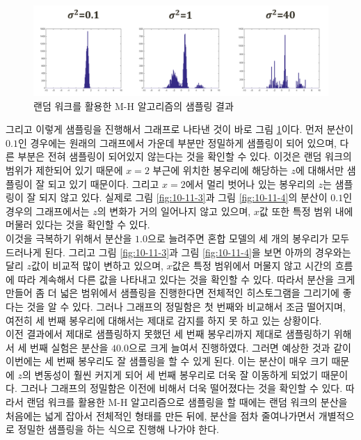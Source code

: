\documentclass[a4paper]{oblivoir}
\begin{document}
\begin{figure}[ht] \centering 
\includegraphics[scale=0.6]{fig10_23.png} 
\caption{랜덤 워크를 활용한 M-H 알고리즘의 샘플링 결과}
\label{fig:10-11-2}
\end{figure}  

그리고 이렇게 샘플링을 진행해서 그래프로 나타낸 것이 바로 그림 \ref{fig:10-11-2}이다. 먼저 분산이 $0.1$인 경우에는 원래의 그래프에서 가운데 부분만 정밀하게 샘플링이 되어 있으며, 다른 부분은 전혀 샘플링이 되어있지 않는다는 것을 확인할 수 있다. 이것은 랜덤 워크의 범위가 제한되어 있기 때문에 $x=2$ 부근에 위치한 봉우리에 해당하는 $z$에 대해서만 샘플링이 잘 되고 있기 때문이다. 그리고 $x=2$에서 멀리 벗어나 있는 봉우리의 $z$는 샘플링이 잘 되지 않고 있다. 실제로 그림 \ref{fig:10-11-3}과 그림 \ref{fig:10-11-4}의 분산이 $0.1$인 경우의 그래프에서는 $z$의 변화가 거의 일어나지 않고 있으며, $x$값 또한 특정 범위 내에 머물러 있다는 것을 확인할 수 있다. \\

이것을 극복하기 위해서 분산을 $1.0$으로 늘려주면 혼합 모델의 세 개의 봉우리가 모두 드러나게 된다. 그리고 그림 \ref{fig:10-11-3}과 그림 \ref{fig:10-11-4}을 보면 아까의 경우와는 달리 $z$값이 비교적 많이 변하고 있으며, $x$값은 특정 범위에서 머물지 않고 시간의 흐름에 따라 계속해서 다른 값을 나타내고 있다는 것을 확인할 수 있다. 따라서 분산을 크게 만들어 좀 더 넓은 범위에서 샘플링을 진행한다면 전체적인 히스토그램을 그리기에 좋다는 것을 알 수 있다. 그러나 그래프의 정밀함은 첫 번째와 비교해서 조금 떨어지며, 여전히 세 번째 봉우리에 대해서는 제대로 감지를 하지 못 하고 있는 상황이다. \\ 

이전 결과에서 제대로 샘플링하지 못했던 세 번째 봉우리까지 제대로 샘플링하기 위해서 세 번째 실험은 분산을 $40.0$으로 크게 늘여서 진행하였다. 그러면 예상한 것과 같이 이번에는 세 번째 봉우리도 잘 샘플링을 할 수 있게 된다. 이는 분산이 매우 크기 때문에 $z$의 변동성이 훨씬 커지게 되어 세 번째 봉우리로 더욱 잘 이동하게 되었기 때문이다. 그러나 그래프의 정밀함은 이전에 비해서 더욱 떨어졌다는 것을 확인할 수 있다. 따라서 랜덤 워크를 활용한 M-H 알고리즘으로 샘플링을 할 때에는 랜덤 워크의 분산을 처음에는 넓게 잡아서 전체적인 형태를 만든 뒤에, 분산을 점차 줄여나가면서 개별적으로 정밀한 샘플링을 하는 식으로 진행해 나가야 한다. \\
\end{document}
